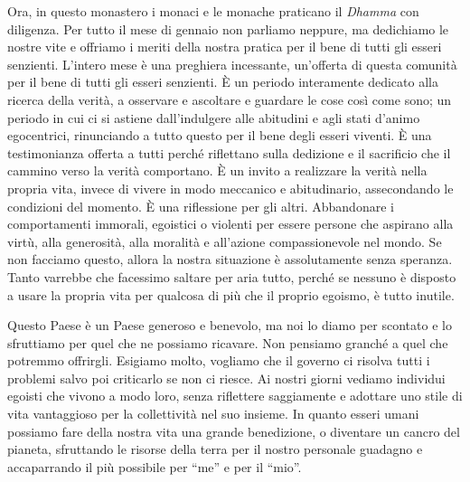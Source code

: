 Ora, in questo monastero i monaci e le monache praticano il \textit{Dhamma} con
diligenza. Per tutto il mese di gennaio non parliamo neppure, ma
dedichiamo le nostre vite e offriamo i meriti della nostra pratica per
il bene di tutti gli esseri senzienti. L'intero mese è una preghiera
incessante, un'offerta di questa comunità per il bene di tutti gli
esseri senzienti. È un periodo interamente dedicato alla ricerca della
verità, a osservare e ascoltare e guardare le cose così come sono; un
periodo in cui ci si astiene dall'indulgere alle abitudini e agli stati
d'animo egocentrici, rinunciando a tutto questo per il bene degli esseri
viventi. È una testimonianza offerta a tutti perché riflettano sulla
dedizione e il sacrificio che il cammino verso la verità comportano. È
un invito a realizzare la verità nella propria vita, invece di vivere in
modo meccanico e abitudinario, assecondando le condizioni del momento.
È una riflessione per gli altri. Abbandonare i comportamenti immorali,
egoistici o violenti per essere persone che aspirano alla virtù, alla
generosità, alla moralità e all'azione compassionevole nel mondo. Se non
facciamo questo, allora la nostra situazione è assolutamente senza
speranza. Tanto varrebbe che facessimo saltare per aria tutto, perché se
nessuno è disposto a usare la propria vita per qualcosa di più che il
proprio egoismo, è tutto inutile.

Questo Paese è un Paese generoso e benevolo, ma noi lo diamo per
scontato e lo sfruttiamo per quel che ne possiamo ricavare. Non pensiamo
granché a quel che potremmo offrirgli. Esigiamo molto, vogliamo che il
governo ci risolva tutti i problemi salvo poi criticarlo se non ci
riesce. Ai nostri giorni vediamo individui egoisti che vivono a modo
loro, senza riflettere saggiamente e adottare uno stile di vita
vantaggioso per la collettività nel suo insieme. In quanto esseri umani
possiamo fare della nostra vita una grande benedizione, o diventare un
cancro del pianeta, sfruttando le risorse della terra per il nostro
personale guadagno e accaparrando il più possibile per ``me'' e per il
``mio''.

